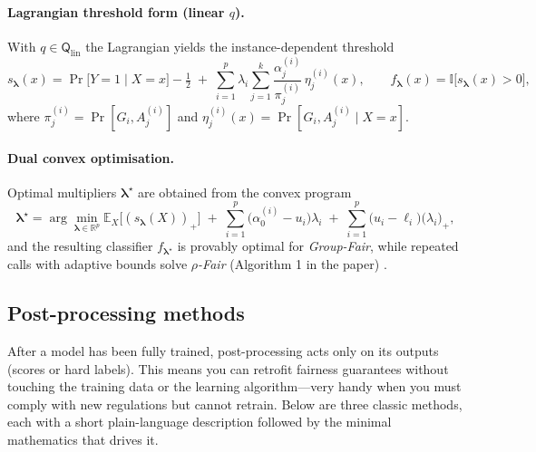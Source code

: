 \documentclass[12pt,a4paper,openright,twoside]{book}
\begin{document}
\paragraph{Lagrangian threshold form (linear $q$).}
With $q\in\mathsf{Q}_{\text{lin}}$ the Lagrangian yields the instance-dependent threshold \cite{celis2020classificationfairnessconstraintsmetaalgorithm}
\[
s_{\boldsymbol\lambda}(x)=
\Pr\!\bigl[Y=1\mid X=x\bigr]-\tfrac12
\;+\;
\sum_{i=1}^{p}\lambda_i
  \sum_{j=1}^{k}
      \frac{\alpha^{(i)}_j}{\pi^{(i)}_j}\,
      \eta^{(i)}_j(x),
\qquad
f_{\boldsymbol\lambda}(x)=\mathbb{I}\bigl[s_{\boldsymbol\lambda}(x)>0\bigr],
\]
where $\pi^{(i)}_j=\Pr[G_i,A^{(i)}_j]$ and $\eta^{(i)}_j(x)=\Pr[G_i,A^{(i)}_j\mid X=x]$.

\paragraph{Dual convex optimisation.}
Optimal multipliers $\boldsymbol\lambda^\star$ are obtained from the convex program \cite{celis2020classificationfairnessconstraintsmetaalgorithm}
\[
\boldsymbol\lambda^\star=\arg\min_{\boldsymbol\lambda\in\mathbb{R}^p}
    \mathbb{E}_X\!\bigl[(s_{\boldsymbol\lambda}(X))_+\bigr]
    \;+\;
    \sum_{i=1}^{p}\bigl(\alpha^{(i)}_0-u_i\bigr)\lambda_i
    \;+\;
    \sum_{i=1}^{p}\bigl(u_i-\ell_i\bigr)\bigl(\lambda_i\bigr)_+,
\]
and the resulting classifier $f_{\boldsymbol\lambda^\star}$ is provably optimal for \emph{Group-Fair}, while repeated calls with adaptive bounds solve \emph{$\rho$-Fair} (Algorithm 1 in the paper) \cite{celis2020classificationfairnessconstraintsmetaalgorithm}.


\subsection{Post-processing methods} 
After a model has been fully trained, post-processing acts only on its outputs (scores or hard labels).
This means you can retrofit fairness guarantees without touching the training data or the learning algorithm—very handy when you must comply with new regulations but cannot retrain.
Below are three classic methods, each with a short plain-language description followed by the minimal mathematics that drives it.
\end{document}
